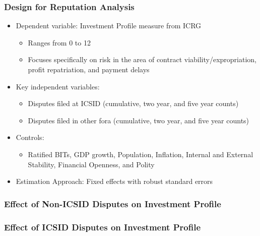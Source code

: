 \documentclass[10pt]{beamer}
\begin{document}
\begin{frame}
\frametitle{Design for Reputation Analysis}

\begin{itemize}
\item Dependent variable: Investment Profile measure from ICRG
\begin{itemize}
\item Ranges from 0 to 12
\item Focuses specifically on risk in the area of contract viability/expropriation, profit repatriation, and payment delays
\end{itemize}
\item Key independent variables: 
\begin{itemize}
\item Disputes filed at ICSID (cumulative, two year, and five year counts)
\item Disputes filed in other fora (cumulative, two year, and five year counts)
\end{itemize}
\item Controls:
\begin{itemize}
\item Ratified BITs, GDP growth, Population, Inflation, Internal and External Stability, Financial Openness, and Polity
\end{itemize}
\item Estimation Approach: Fixed effects with robust standard errors
\end{itemize}

\end{frame}

\begin{frame}
\frametitle{Effect of Non-ICSID Disputes on Investment Profile}

\begin{figure}[ht]
	\centering
	\vspace{-5mm}	
	\resizebox{1\textwidth}{!}{}	
\end{figure}

\end{frame}

\begin{frame}
\frametitle{Effect of ICSID Disputes on Investment Profile}

\begin{figure}[ht]
	\centering
	\vspace{-5mm}	
	\resizebox{1\textwidth}{!}{}
\end{figure}

\end{frame}
\end{document}
